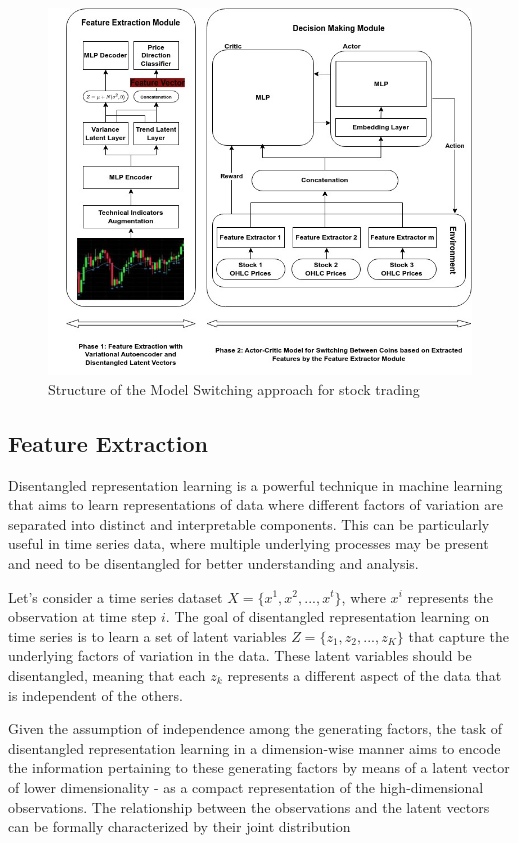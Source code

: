 \begin{figure}[H]
	\centering
	\includegraphics[scale=0.6]{./NewArch.jpg}
	\caption{Structure of the Model Switching approach for stock trading}
	\label{fig:arch}
\end{figure}


\subsection{Feature Extraction}

Disentangled representation learning is a powerful technique in machine learning that aims to learn representations of data where different factors of variation are separated into distinct and interpretable components. This can be particularly useful in time series data, where multiple underlying processes may be present and need to be disentangled for better understanding and analysis.

Let's consider a time series dataset $X = \{x^1, x^2, ..., x^t\}$, where $x^i$ represents the observation at time step $i$. The goal of disentangled representation learning on time series is to learn a set of latent variables $Z = \{z_1, z_2, ..., z_K\}$ that capture the underlying factors of variation in the data. These latent variables should be disentangled, meaning that each $z_k$ represents a different aspect of the data that is independent of the others.

Given the assumption of independence among the generating factors, the task of disentangled representation learning in a dimension-wise manner aims to encode the information pertaining to these generating factors by means of a latent vector of lower dimensionality - as a compact representation of the high-dimensional observations. The relationship between the observations and the latent vectors can be formally characterized by their joint distribution

